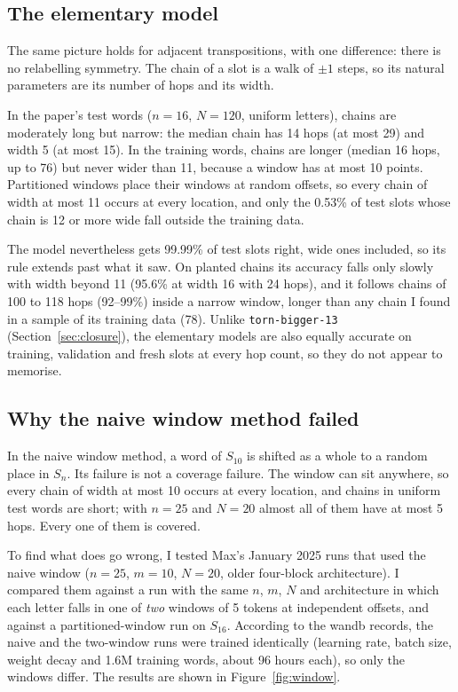 \documentclass[11pt,a4paper]{article}
\newcommand{\tb}{\texttt{torn-bigger-13}}
\begin{document}
\subsection{The elementary model}\label{sec:elem}

The same picture holds for adjacent transpositions, with one difference: there is no relabelling symmetry. The chain of a slot is a walk of $\pm1$ steps, so its natural parameters are its number of hops and its width.

In the paper's test words ($n=16$, $N=120$, uniform letters), chains are moderately long but narrow: the median chain has 14 hops (at most 29) and width 5 (at most 15). In the training words, chains are longer (median 16 hops, up to 76) but never wider than 11, because a window has at most 10 points. Partitioned windows place their windows at random offsets, so every chain of width at most 11 occurs at every location, and only the 0.53\% of test slots whose chain is 12 or more wide fall outside the training data.

The model nevertheless gets 99.99\% of test slots right, wide ones included, so its rule extends past what it saw. On planted chains its accuracy falls only slowly with width beyond 11 (95.6\% at width 16 with 24 hops), and it follows chains of 100 to 118 hops (92--99\%) inside a narrow window, longer than any chain I found in a sample of its training data (78). Unlike \tb{} (Section~\ref{sec:closure}), the elementary models are also equally accurate on training, validation and fresh slots at every hop count, so they do not appear to memorise.

\subsection{Why the naive window method failed}\label{sec:window}

In the naive window method, a word of $S_{10}$ is shifted as a whole to a random place in $S_n$. Its failure is not a coverage failure. The window can sit anywhere, so every chain of width at most 10 occurs at every location, and chains in uniform test words are short; with $n=25$ and $N=20$ almost all of them have at most 5 hops. Every one of them is covered.

To find what does go wrong, I tested Max's January 2025 runs that used the naive window ($n=25$, $m=10$, $N=20$, older four-block architecture). I compared them against a run with the same $n$, $m$, $N$ and architecture in which each letter falls in one of \emph{two} windows of 5 tokens at independent offsets, and against a partitioned-window run on $S_{16}$. According to the wandb records, the naive and the two-window runs were trained identically (learning rate, batch size, weight decay and 1.6M training words, about 96 hours each), so only the windows differ. The results are shown in Figure~\ref{fig:window}.
\end{document}
